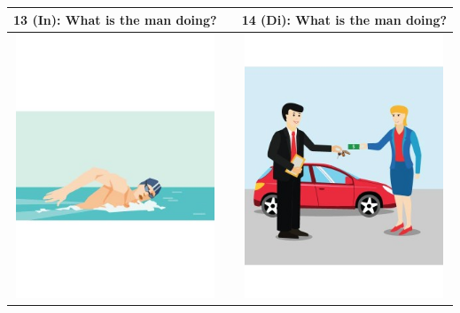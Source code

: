 \documentclass[12pt,notitlepage]{article}
\begin{document}
\begin{center}
\begin{tabular}{|c|c|c|}
\hline
13 (In): What is the man doing? && 14 (Di): What is the man doing? \\
\hline
\includegraphics[width=16em,trim=0 0 0 -3]{figures/I13.jpg} & & \includegraphics[width=16em,trim=0 0 0 -3]{figures/I14.jpg} \\
\hline
\end{tabular}
\vspace{1em} \\



\end{center}
\end{document}
